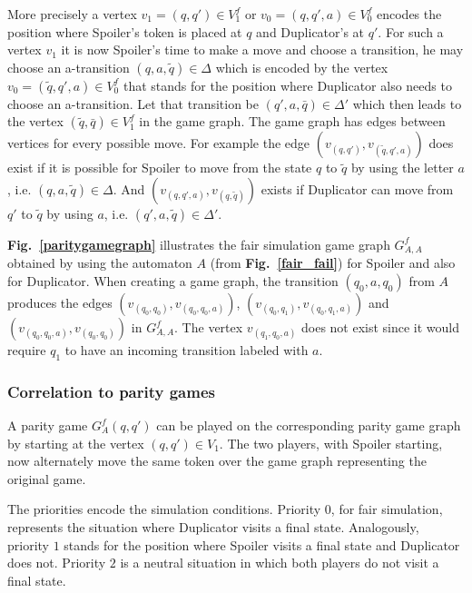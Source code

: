 \documentclass[12pt,oneside,bibliography=totoc,abstracton]{scrartcl}
\newcommand{\figref}[1]{\textbf{Fig.~\ref{#1}}}
\begin{document}
More precisely a vertex $v_1 = (q, q') \in V^f_1$ or $v_0 = (q, q', a) \in V^f_0$
encodes the position where Spoiler's token is placed at $q$ and Duplicator's at $q'$.
For such a vertex $v_1$ it is now Spoiler's time to make a move and choose a transition, he may choose
an a-transition $(q, a, \tilde{q}) \in \Delta$ which is encoded by the vertex $v_0 = (\tilde{q}, q', a) \in V^f_0$
that stands for the position where Duplicator also needs to choose an a-transition. Let that transition
be $(q', a, \bar{q}) \in \Delta'$ which then leads to the vertex $(\tilde{q}, \bar{q}) \in V^f_1$ in the game graph.
The game graph has edges between vertices for every possible move. For example the edge
$(v_{(q, q')}, v_{(\tilde{q}, q', a)})$ does exist if it is possible for Spoiler to move from the state
$q$ to $\tilde{q}$ by using the letter $a$, i.e. $(q, a, \tilde{q}) \in \Delta$. And $(v_{(q, q', a)}, v_{(q, \tilde{q})})$
exists if Duplicator can move from $q'$ to $\tilde{q}$ by using $a$, i.e. $(q', a, \tilde{q}) \in \Delta'$.

\figref{paritygamegraph} illustrates the fair simulation game graph $G^f_{A, A}$ obtained by using
the automaton $A$ (from \figref{fair_fail}) for Spoiler and also for Duplicator. When creating a game graph,
the transition $(q_0, a, q_0)$ from $A$ produces the edges $(v_{(q_0, q_0)}, v_{(q_0, q_0, a)})$,
$(v_{(q_0, q_1)}, v_{(q_0, q_1, a)})$ and $(v_{(q_0, q_0, a)}, v_{(q_0, q_0)})$ in $G^f_{A, A}$.
The vertex $v_{(q_1, q_0, a)}$ does not exist since it would require $q_1$
to have an incoming transition labeled with $a$.

\subsubsection{Correlation to parity games}\label{section_gamegraphtogame}
A parity game $G^f_A(q, q')$ can be played on the corresponding parity game graph by starting at the vertex $(q, q') \in V_1$.
The two players, with Spoiler starting, now alternately move the same token over the game graph representing the original game.

The priorities encode the simulation conditions. Priority $0$, for fair simulation, represents the situation where Duplicator visits a
final state. Analogously, priority $1$ stands for the position where Spoiler visits a final state and Duplicator does not.
Priority $2$ is a neutral situation in which both players do not visit a final state.
\end{document}
